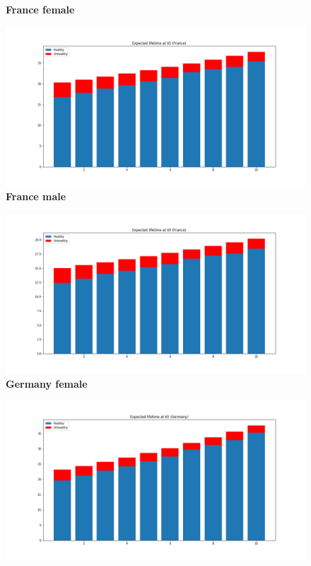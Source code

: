 \begin{figure}[H]
\centering \textbf{France female}\par\medskip
  \includegraphics[width=\linewidth]{images/new_results/France_1_f.png}
 \endminipage\hfill
{}
\centering \textbf{France male}\par\medskip
  \includegraphics[width=\linewidth]{images/new_results/France_1_m.png}
\endminipage\hfill
{}
\centering \textbf{Germany female}\par\medskip
  \includegraphics[width=\linewidth]{images/new_results/Germany_1_f.png}

\end{figure}
